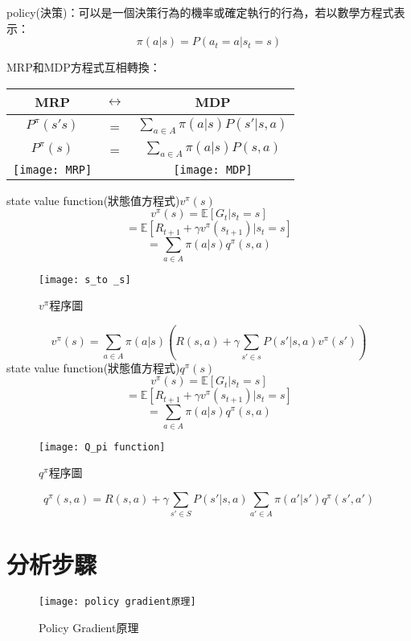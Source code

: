 \begin{flushleft}
policy(決策)：可以是一個決策行為的機率或確定執行的行為，若以數學方程式表示：
$$\pi (a|s) = P(a_t=a|s_t=s)$$
\newpage

MRP和MDP方程式互相轉換：\\
\end{flushleft}
\begin{center}
\begin{tabular}[c]{ccc}    
 MRP & $\longleftrightarrow$ & MDP\\
\hline
$P^{\pi}(s's)$ & = & $\sum_{a\in A}\pi (a|s)P(s'|s, a)$\\
$P^{\pi}(s)$ & = & $\sum_{a\in A}\pi (a|s)P(s, a)$\\
\texttt{[image: MRP]}&&\texttt{[image: MDP]}\\
\hline
\end{tabular}
\end{center}
\hspace{15pt}
 
state value function(狀態值方程式)$v^{\pi}(s)$\\
$$v^{\pi}(s) = \mathbb{E}[G_t|s_t=s]$$
$$= \mathbb{E}[R_{t+1}+\gamma v^{\pi}(s_{t+1})|s_t=s]$$
$$= \sum_{a\in A}\pi (a|s)q^{\pi}(s, a)$$
\begin{figure}[hbt!]
\begin{center}
\texttt{[image: s\_to \_s]}
\caption{$v^{\pi}$程序圖}
\label{fig.s_to_s}
\end{center}
\end{figure}
$$v^{\pi}(s) = \sum_{a\in A}\pi (a|s)(R(s, a)+\gamma \sum_{s'\in s}P(s'|s, a)v^{\pi}(s'))$$
\newpage
state value function(狀態值方程式)$q^{\pi}(s)$
$$v^{\pi}(s) = \mathbb{E}[G_t|s_t=s]$$
$$= \mathbb{E}[R_{t+1}+\gamma v^{\pi}(s_{t+1})|s_t=s]$$
$$= \sum_{a\in A}\pi (a|s)q^{\pi}(s, a)$$
\begin{figure}[hbt!]
\begin{center}
\texttt{[image: Q\_pi function]}
\caption{$q^{\pi}$程序圖}
\label{fig.q_pi}
\end{center}
\end{figure}
$$q^\pi(s, a)=R(s, a)+\gamma\sum_{s'\in S}P(s'|s, a)\sum_{a'\in A}\pi(a'|s')q^{\pi}(s', a')$$
\newpage
\section{分析步驟}
\begin{figure}[hbt!]
\begin{center}
\texttt{[image: policy gradient原理]}
\caption{\Large Policy Gradient原理}
\label{Policy Gradient原理}
\end{center}
\end{figure}

